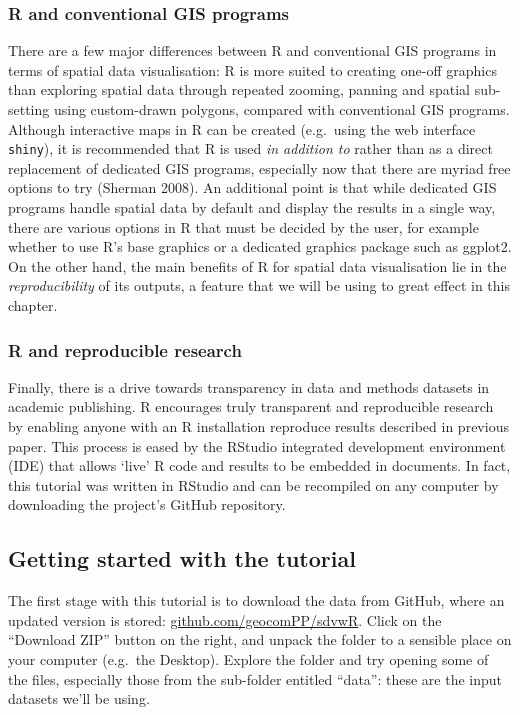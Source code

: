\documentclass[]{article}
\begin{document}
\subsubsection{R and conventional GIS programs}

There are a few major differences between R and conventional GIS
programs in terms of spatial data visualisation: R is more suited to
creating one-off graphics than exploring spatial data through repeated
zooming, panning and spatial sub-setting using custom-drawn polygons,
compared with conventional GIS programs. Although interactive maps in R
can be created (e.g.~using the web interface \texttt{shiny}), it is
recommended that R is used \emph{in addition to} rather than as a direct
replacement of dedicated GIS programs, especially now that there are
myriad free options to try (Sherman 2008). An additional point is that
while dedicated GIS programs handle spatial data by default and display
the results in a single way, there are various options in R that must be
decided by the user, for example whether to use R's base graphics or a
dedicated graphics package such as ggplot2. On the other hand, the main
benefits of R for spatial data visualisation lie in the
\emph{reproducibility} of its outputs, a feature that we will be using
to great effect in this chapter.

\subsubsection{R and reproducible research}

Finally, there is a drive towards transparency in data and methods
datasets in academic publishing. R encourages truly transparent and
reproducible research by enabling anyone with an R installation
reproduce results described in previous paper. This process is eased by
the RStudio integrated development environment (IDE) that allows `live'
R code and results to be embedded in documents. In fact, this tutorial
was written in RStudio and can be recompiled on any computer by
downloading the project's GitHub repository.

\subsection{Getting started with the tutorial}

The first stage with this tutorial is to download the data from GitHub,
where an updated version is stored:
\href{https://github.com/geocomPP/sdvwR}{github.com/geocomPP/sdvwR}.
Click on the ``Download ZIP'' button on the right, and unpack the folder
to a sensible place on your computer (e.g.~the Desktop). Explore the
folder and try opening some of the files, especially those from the
sub-folder entitled ``data'': these are the input datasets we'll be
using.
\end{document}
